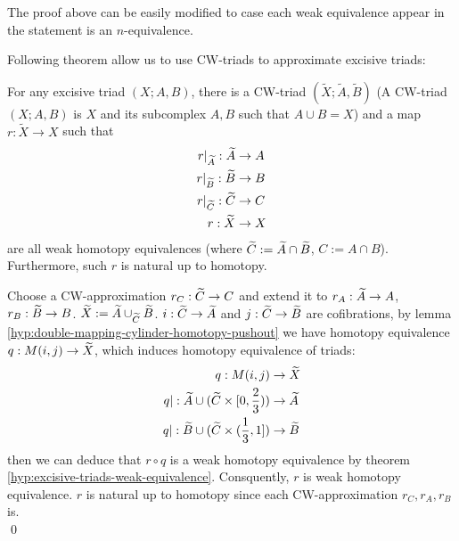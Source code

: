     \begin{note}
        The proof above can be easily modified to case each weak equivalence appear in the statement is an $n$-equivalence.\\
    \end{note}

    Following theorem allow us to use CW-triads to approximate excisive triads:

    \begin{thm}
        \label{hyp:CW-triad-approx-excisive-triad}
        For any excisive triad $(X;A,B)$,
        there is a CW-triad $(\widetilde{X}; \widetilde{A}, \widetilde{B})$
        (A CW-triad $(X;A,B)$ is $X$ and its subcomplex $A,B$ such that $A \cup B = X$)
        and a map $r : \widetilde{X} \to X$
        such that
        \begin{align*}
            r|_{\widetilde{A}} : \widetilde{A} & \to A\\
            r|_{\widetilde{B}} :  \widetilde{B} & \to B \\
            r|_{\widetilde{C}} : \widetilde{C} & \to C\\
            r  : \widetilde{X} & \to X
        \end{align*}
        are all weak homotopy equivalences (where $\widetilde{C} := \widetilde{A} \cap \widetilde{B}$, $C := A \cap B$).
        Furthermore, such $r$ is natural up to homotopy.
    \end{thm}

    \begin{prf}
        Choose a CW-approximation $r_C : \widetilde{C} \to C$
        and extend it to $r_A : \widetilde{A} \to A$, $r_B : \widetilde{B} \to B$.
        $\widetilde{X} := \widetilde{A} \cup_{\widetilde{C}} \widetilde{B}$.
        $i : \widetilde{C} \to \widetilde{A} $ and $j : \widetilde{C} \to \widetilde{B}$
        are cofibrations,
        by lemma \ref{hyp:double-mapping-cylinder-homotopy-pushout}
        we have homotopy equivalence $q : M(i,j) \to \widetilde{X}$,
        which induces homotopy equivalence of triads:
        \begin{align*}
            q : M(i,j) & \to \widetilde{X}\\
            q| : \widetilde{A} \cup (\widetilde{C} \times [0,\frac{2}{3})) & \to \widetilde{A}\\
            q| : \widetilde{B} \cup (\widetilde{C} \times (\frac{1}{3},1]) & \to \widetilde{B}\\
        \end{align*}
        then we can deduce that
        $r \circ q$
        is a weak homotopy equivalence by theorem \ref{hyp:excisive-triads-weak-equivalence}.
        Consquently, $r$ is weak homotopy equivalence.
        $r$ is natural up to homotopy since each CW-approximation $r_C, r_A, r_B$ is.\\
        \qed
    \end{prf}
    
